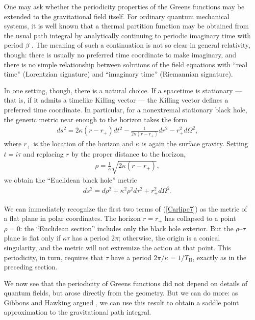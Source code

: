 \documentclass[11pt]{article}
\begin{document}
One may ask whether the periodicity properties of the Greens
functions may be extended to the gravitational field itself.
For ordinary quantum mechanical systems, it is well known that 
a thermal partition function may be obtained from the
usual path integral by analytically continuing to periodic
imaginary time with period $\beta$ \cite{Feynman}.  The meaning
of such a continuation is not so clear in general
relativity, though: there is usually no preferred time coordinate to 
make imaginary, and there is no simple relationship between
solutions of the field equations with ``real time'' (Lorentzian
signature) and ``imaginary time'' (Riemannian signature).  

In one setting, though, there is a natural choice.  If a spacetime 
is stationary --- that is, if it admits a timelike Killing vector --- 
the Killing vector defines a preferred time coordinate.  In particular, 
for a nonextremal stationary black hole, the generic metric near 
enough to the horizon takes the form
\begin{align*}
ds^2 = 2\kappa(r-r_+)dt^2 - \frac{1}{2\kappa(r-r_+)}dr^2 
  - r_+^2d\Omega^2   ,
\end{align*}
where $r_+$ is the location of the horizon and $\kappa$ is again 
the surface gravity.  Setting $t=i\tau$ and replacing $r$ by the 
proper distance to the horizon,
\begin{align*}
\rho = \frac{1}{\kappa}\sqrt{2\kappa(r-r_+)}  ,
\end{align*}
we obtain the ``Euclidean black hole'' metric
\begin{align}
ds^2 = d\rho^2 + \kappa^2\rho^2d\tau^2  + r_+^2d\Omega^2 .
\label{Carlipe7}
\end{align}

We can immediately recognize the first two terms of (\ref{Carlipe7})
as the metric of a flat plane in polar coordinates.  The 
horizon $r=r_+$ has collapsed to a point $\rho=0$: the 
``Euclidean section'' includes only the black hole exterior.  
But the $\rho$--$\tau$ plane is flat only if $\kappa\tau$ has a 
period $2\pi$; otherwise, the origin is a conical singularity, and the 
metric will not extremize the action at that point.  This periodicity, 
in turn, requires that $\tau$ have a period 
$2\pi/\kappa = 1/T_{\scriptscriptstyle\mathrm{H}}$,
exactly as in the preceding section.

We now see that the periodicity of Greens functions did not depend 
on details of quantum fields, but arose directly from the geometry.  But 
we can do more: as Gibbons and Hawking argued \cite{GibHawk}, 
we can use this result to obtain a saddle point approximation to the 
gravitational path integral.
\end{document}
